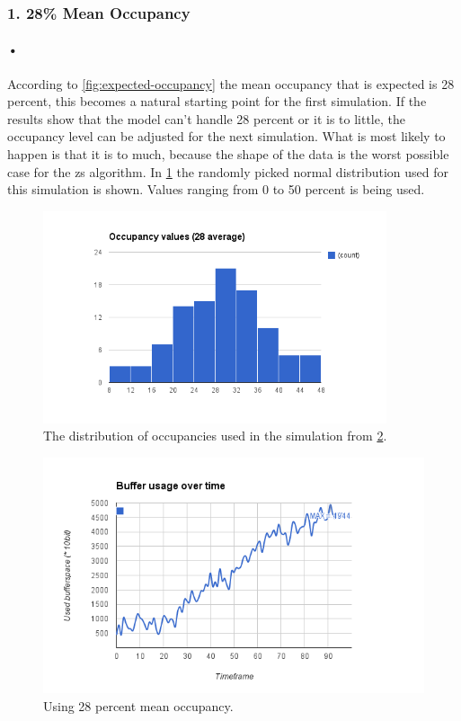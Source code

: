 \documentclass[a4paper, 12pt, openright, twoside]{report}
\begin{document}
\subsubsection{1. 28\% Mean Occupancy}

\paragraph{•}
According to \ref{fig:expected-occupancy} the mean occupancy that is expected is 28 percent, this becomes a natural starting point for the first simulation.
If the results show that the model can't handle 28 percent or it is to little, the occupancy level can be adjusted for the next simulation.
What is most likely to happen is that it is to much, because the shape of the data is the worst possible case for the \gls{zs} algorithm. 
In \ref{fig:28-dist} the randomly picked normal distribution used for this simulation is shown.
Values ranging from 0 to 50 percent is being used.

\begin{figure}[h!]
	\centering
		\includegraphics[width=0.9\textwidth]{images/occupancy-28.png}
		\caption{The distribution of occupancies used in the simulation from \ref{fig:28-occ}.}
		\label{fig:28-dist}
\end{figure}

\begin{figure}[h!]
	\centering
		\includegraphics[width=1.0\textwidth]{images/mean-28.png}
		\caption{Using 28 percent mean occupancy.}
		\label{fig:28-occ}
\end{figure}
\end{document}
